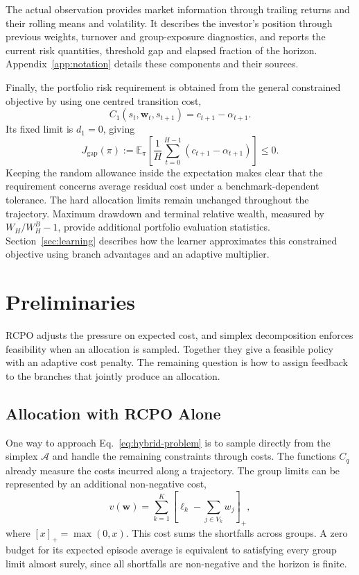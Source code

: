 \documentclass[10pt]{article}
\begin{document}
The actual observation provides market information through trailing returns and their rolling means and volatility. It describes the investor's position through previous weights, turnover and group-exposure diagnostics, and reports the current risk quantities, threshold gap and elapsed fraction of the horizon. Appendix~\ref{app:notation} details these components and their sources.

Finally, the portfolio risk requirement is obtained from the general constrained objective by using one centred transition cost,
\begin{equation}
  C_1(s_t,\bm w_t,s_{t+1})=c_{t+1}-\alpha_{t+1}.
  \label{eq:portfolio-centred-cost}
\end{equation}
Its fixed limit is $d_1=0$, giving
\begin{equation}
  J_{\mathrm{gap}}(\pi)
    :=\mathbb E_\pi\!\left[
       \frac1H\sum_{t=0}^{H-1}
       (c_{t+1}-\alpha_{t+1})\right]\leq0.
  \label{eq:adaptive-risk-problem}
\end{equation}
Keeping the random allowance inside the expectation makes clear that the requirement concerns average residual cost under a benchmark-dependent tolerance. The hard allocation limits remain unchanged throughout the trajectory. Maximum drawdown and terminal relative wealth, measured by $W_H/W_H^B-1$, provide additional portfolio evaluation statistics. Section~\ref{sec:learning} describes how the learner approximates this constrained objective using branch advantages and an adaptive multiplier.

\section{Preliminaries}
\label{sec:preliminaries}
\label{sec:reformulation}

RCPO adjusts the pressure on expected cost, and simplex decomposition enforces feasibility when an allocation is sampled. Together they give a feasible policy with an adaptive cost penalty. The remaining question is how to assign feedback to the branches that jointly produce an allocation.

\subsection{Allocation with RCPO Alone}

One way to approach Eq.~\eqref{eq:hybrid-problem} is to sample directly from the simplex $\mathcal A$ and handle the remaining constraints through costs. The functions $C_q$ already measure the costs incurred along a trajectory. The group limits can be represented by an additional non-negative cost,
\begin{equation}
  v(\bm w)=\sum_{k=1}^K
      \left[\ell_k-\sum_{j\in V_k}w_j\right]_+,
  \label{eq:group-shortfall}
\end{equation}
where $[x]_+=\max(0,x)$. This cost sums the shortfalls across groups. A zero budget for its expected episode average is equivalent to satisfying every group limit almost surely, since all shortfalls are non-negative and the horizon is finite.
\end{document}
